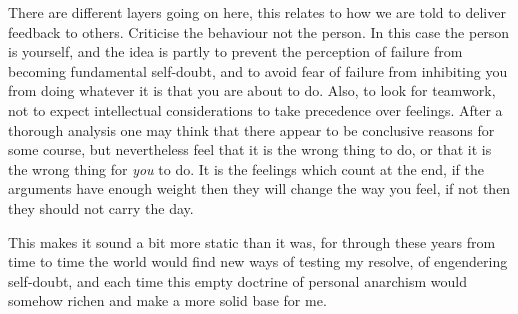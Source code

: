 There are different layers going on here, this relates to how we are told to deliver feedback to others.
Criticise the behaviour not the person.
In this case the person is yourself, and the idea is partly to prevent the perception of failure from becoming fundamental self-doubt, and to avoid fear of failure from inhibiting you from doing whatever it is that you are about to do.
Also, to look for teamwork, not to expect intellectual considerations to take precedence over feelings.
After a thorough analysis one may think that there appear to be conclusive reasons for some course, but nevertheless feel that it is the wrong thing to do, or that it is the wrong thing for {\it you} to do.
It is the feelings which count at the end, if the arguments have enough weight then they will change the way you feel, if not then they should not carry the day.

This makes it sound a bit more static than it was, for through these years from time to time the world would find new ways of testing my resolve, of engendering self-doubt, and each time this empty doctrine of personal anarchism would somehow richen and make a more solid base for me.







